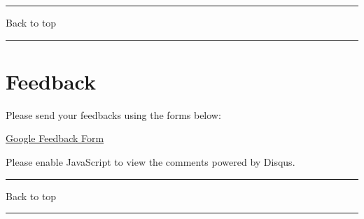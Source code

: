 \documentclass[]{article}
\begin{document}
{}

{}

\begin{center}\rule{0.5\linewidth}{\linethickness}\end{center}

Back to top

\begin{center}\rule{0.5\linewidth}{\linethickness}\end{center}

\pagebreak

\hypertarget{feedback}{%
\section{Feedback}\label{feedback}}

Please send your feedbacks using the forms below:

\href{https://docs.google.com/forms/d/e/1FAIpQLSeD3Z9J6Y7eMmiyM12f_SfAmHUlykb1zxZcwO6lg7cebGYQIQ/viewform}{Google
Feedback Form}

\hypertarget{disqus_thread}{}

Please enable JavaScript to view the comments powered by Disqus.

\begin{center}\rule{0.5\linewidth}{\linethickness}\end{center}

Back to top

\begin{center}\rule{0.5\linewidth}{\linethickness}\end{center}

\pagebreak
\end{document}
